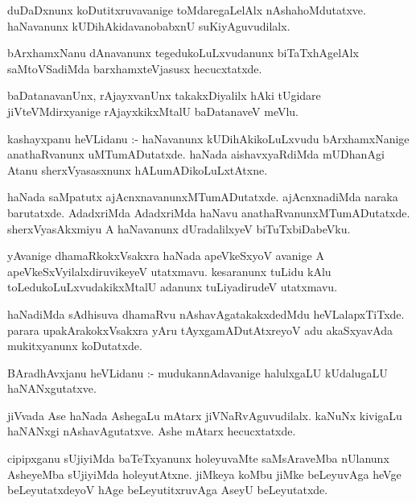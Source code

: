 \documentclass{article}
\begin{document}
\begin{mn}
duDaDxnunx  koDutitxruvavanige  toMdaregaLelAlx  nAshahoMdutatxve.  haNavanunx  
kUDihAkidavanobabxnU  suKiyAguvudilalx.
\end{mn}

\begin{mn}
bArxhamxNanu  dAnavanunx  tegedukoLuLxvudanunx  biTaTxhAgelAlx  saMtoVSadiMda  barxhamxteVjasusx  hecucxtatxde.
\end{mn}

\begin{mn}
baDatanavanUnx,  rAjayxvanUnx  takakxDiyalilx  hAki  tUgidare  jiVteVMdirxyanige  rAjayxkikxMtalU  baDatanaveV  meVlu.
\end{mn}

\begin{mn}
kashayxpanu  heVLidanu :- haNavanunx  kUDihAkikoLuLxvudu  bArxhamxNanige  anathaRvanunx  
uMTumADutatxde.  haNada  aishavxyaRdiMda  mUDhanAgi  Atanu  sherxVyasasxnunx  hALumADikoLuLxtAtxne.
\end{mn}

\begin{mn}
haNada  saMpatutx  ajAcnxnavanunxMTumADutatxde.  ajAcnxnadiMda  naraka  barutatxde.  
AdadxriMda  AdadxriMda  haNavu  anathaRvanunxMTumADutatxde.  sherxVyasAkxmiyu  A  
haNavanunx  dUradalilxyeV  biTuTxbiDabeVku.
\end{mn}

\begin{mn}
yAvanige  dhamaRkokxVsakxra  haNada  apeVkeSxyoV  avanige  A  apeVkeSxVyilalxdiruvikeyeV  
utatxmavu.  kesaranunx  tuLidu  kAlu  toLedukoLuLxvudakikxMtalU  adanunx  tuLiyadirudeV  utatxmavu.
\end{mn}

\begin{mn}
haNadiMda  sAdhisuva  dhamaRvu  nAshavAgatakakxdedMdu  heVLalapxTiTxde.  parara  
upakArakokxVsakxra  yAru  tAyxgamADutAtxreyoV  adu  akaSxyavAda  mukitxyanunx  koDutatxde.
\end{mn}

\begin{mn}
BAradhAvxjanu  heVLidanu :-  mudukannAdavanige  halulxgaLU  kUdalugaLU  haNANxgutatxve.  

jiVvada  Ase  haNada AshegaLu  mAtarx  jiVNaRvAguvudilalx.  kaNuNx  kivigaLu  haNANxgi  
nAshavAgutatxve.  Ashe  mAtarx  hecucxtatxde. 
\end{mn}

\begin{mn}
cipipxganu  sUjiyiMda  baTeTxyanunx  holeyuvaMte  saMsAraveMba  nUlanunx  AsheyeMba  
sUjiyiMda  holeyutAtxne. jiMkeya  koMbu  jiMke  beLeyuvAga  heVge  beLeyutatxdeyoV  
hAge  beLeyutitxruvAga  AseyU  beLeyutatxde.
\end{mn}
\end{document}
